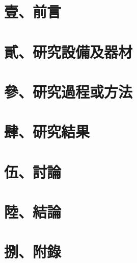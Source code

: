 \documentclass[12pt]{article}
\author{翁浩庭、鄭沐臻}
\date{\today}
\begin{document}
\pagestyle{empty}


\clearpage
\pagestyle{plain}
\setcounter{page}{1}



\section*{壹、前言}


\section*{貳、研究設備及器材}



\section*{參、研究過程或方法}

\section*{肆、研究結果}


\section*{伍、討論}


\section*{陸、結論}


\printbibliography[title={柒、參考文獻資料}]

\section*{捌、附錄}

\end{document}
